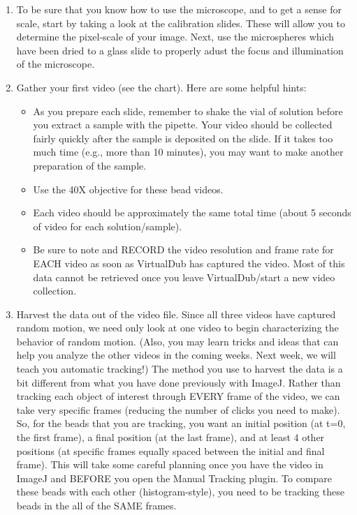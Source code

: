 \begin{enumerate}
\item To be sure that you know how to use the microscope, and to get a sense for scale, start by taking a look at the calibration slides. These will allow you to determine the pixel-scale of your image. Next, use the microspheres which have been dried to a glass slide to properly adust the focus and illumination of the microscope.
\item Gather your first video (see the chart). Here are some helpful hints:
\begin{itemize}
\item As you prepare each slide, remember to shake the vial of solution before you extract a sample with the pipette. Your video should be collected fairly quickly after the sample is deposited on the slide. If it takes too much time (e.g., more than 10 minutes), you may want to make another preparation of the sample.
\item Use the 40X objective for these bead videos.
\item Each video should be approximately the same total time (about 5 seconds of video for each solution/sample).
\item Be sure to note and RECORD the video resolution and frame rate for EACH video as soon as VirtualDub has captured the video. Most of this data cannot be retrieved once you leave VirtualDub/start a new video collection.
\end{itemize}
\item Harvest the data out of the video file. 
Since all three videos have captured random motion, we need only look at one video to begin characterizing the behavior of random motion. 
(Also, you may learn tricks and ideas that can help you analyze the other videos in the coming weeks. Next week, we will teach you automatic tracking!) 
The method you use to harvest the data is a bit different from what you have done previously with ImageJ. 
Rather than tracking each object of interest through EVERY frame of the video, we can take very specific frames (reducing the number of clicks you need to make). 
So, for the beads that you are tracking, you want an initial position (at t=0, the first frame), a final position (at the last frame), and at least 4 other positions (at specific frames equally spaced between the initial and final frame). 
This will take some careful planning once you have the video in ImageJ and BEFORE you open the Manual Tracking plugin. 
To compare these beads with each other (histogram-style), you need to be tracking these beads in the all of the SAME frames. 

\end{enumerate}
